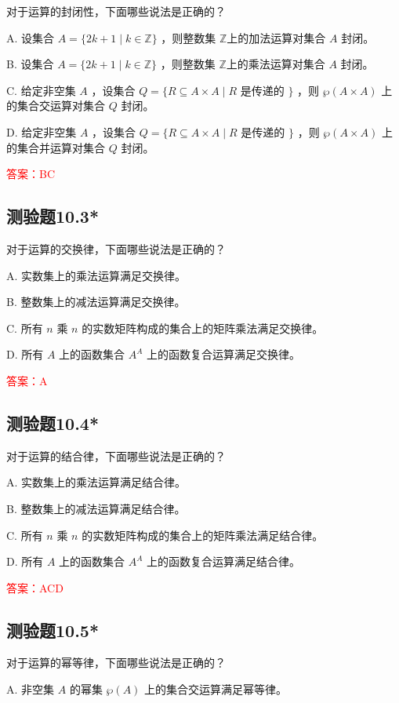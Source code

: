 \documentclass[UTF8, heading=true]{ctexart}
\begin{document}
对于运算的封闭性，下面哪些说法是正确的？

A. 设集合 $A=\{2 k+1 \mid k \in \mathbb{Z}\}$ ，则整数集 $\mathbb{Z} $上的加法运算对集合 $A$ 封闭。

B. 设集合 $A=\{2 k+1 \mid k \in \mathbb{Z}\}$ ，则整数集 $\mathbb{Z} $上的乘法运算对集合 $A$ 封闭。

C. 给定非空集 $A$ ，设集合 $Q=\{R \subseteq A \times A \mid R$ 是传递的 $\}$ ，则 $\wp(A \times A)$ 上的集合交运算对集合 $Q$ 封闭。

D. 给定非空集 $A$ ，设集合 $Q=\{R \subseteq A \times A \mid R$ 是传递的 $\}$ ，则 $\wp(A \times A)$ 上的集合并运算对集合 $Q$ 封闭。


\textcolor{red}{答案：BC}

\subsection{测验题10.3*}

对于运算的交换律，下面哪些说法是正确的？

A. 实数集上的乘法运算满足交换律。

B. 整数集上的减法运算满足交换律。

C. 所有 $n$ 乘 $n$ 的实数矩阵构成的集合上的矩阵乘法满足交换律。

D. 所有 $A$ 上的函数集合 $A^A$ 上的函数复合运算满足交换律。

\textcolor{red}{答案：A}

\subsection{测验题10.4*}

对于运算的结合律，下面哪些说法是正确的？

A. 实数集上的乘法运算满足结合律。

B. 整数集上的减法运算满足结合律。

C. 所有 $n$ 乘 $n$ 的实数矩阵构成的集合上的矩阵乘法满足结合律。

D. 所有 $A$ 上的函数集合 $A^A$ 上的函数复合运算满足结合律。

\textcolor{red}{答案：ACD}

\subsection{测验题10.5*}

对于运算的幂等律，下面哪些说法是正确的？

A. 非空集 $A$ 的幂集 $\wp(A)$ 上的集合交运算满足幂等律。
\end{document}
